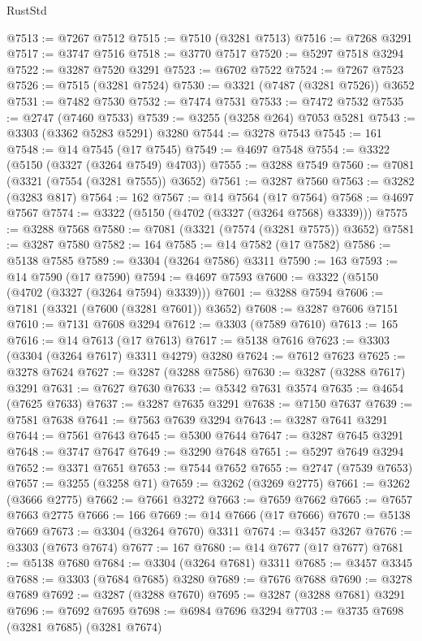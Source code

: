 \begin{lexlean}{RustStd}
\begin{coremodule}
@7513 := @7267 @7512
@7515 := @7510 (@3281 @7513)
@7516 := @7268 @3291
@7517 := @3747 @7516
@7518 := @3770 @7517
@7520 := @5297 @7518 @3294
@7522 := @3287 @7520 @3291
@7523 := @6702 @7522
@7524 := @7267 @7523
@7526 := @7515 (@3281 @7524)
@7530 := @3321 (@7487 (@3281 @7526)) @3652
@7531 := @7482 @7530
@7532 := @7474 @7531
@7533 := @7472 @7532
@7535 := @2747 (@7460 @7533)
@7539 := @3255 (@3258 @264) @7053 @5281
@7543 := @3303 (@3362 @5283 @5291) @3280
@7544 := @3278 @7543
@7545 := 161
@7548 := @14 @7545 (@17 @7545)
@7549 := @4697 @7548
@7554 := @3322 (@5150 (@3327 (@3264 @7549) @4703))
@7555 := @3288 @7549
@7560 := @7081 (@3321 (@7554 (@3281 @7555)) @3652)
@7561 := @3287 @7560
@7563 := @3282 (@3283 @817)
@7564 := 162
@7567 := @14 @7564 (@17 @7564)
@7568 := @4697 @7567
@7574 := @3322 (@5150 (@4702 (@3327 (@3264 @7568) @3339)))
@7575 := @3288 @7568
@7580 := @7081 (@3321 (@7574 (@3281 @7575)) @3652)
@7581 := @3287 @7580
@7582 := 164
@7585 := @14 @7582 (@17 @7582)
@7586 := @5138 @7585
@7589 := @3304 (@3264 @7586) @3311
@7590 := 163
@7593 := @14 @7590 (@17 @7590)
@7594 := @4697 @7593
@7600 := @3322 (@5150 (@4702 (@3327 (@3264 @7594) @3339)))
@7601 := @3288 @7594
@7606 := @7181 (@3321 (@7600 (@3281 @7601)) @3652)
@7608 := @3287 @7606 @7151
@7610 := @7131 @7608 @3294
@7612 := @3303 (@7589 @7610)
@7613 := 165
@7616 := @14 @7613 (@17 @7613)
@7617 := @5138 @7616
@7623 := @3303 (@3304 (@3264 @7617) @3311 @4279) @3280
@7624 := @7612 @7623
@7625 := @3278 @7624
@7627 := @3287 (@3288 @7586)
@7630 := @3287 (@3288 @7617) @3291
@7631 := @7627 @7630
@7633 := @5342 @7631 @3574
@7635 := @4654 (@7625 @7633)
@7637 := @3287 @7635 @3291
@7638 := @7150 @7637
@7639 := @7581 @7638
@7641 := @7563 @7639 @3294
@7643 := @3287 @7641 @3291
@7644 := @7561 @7643
@7645 := @5300 @7644
@7647 := @3287 @7645 @3291
@7648 := @3747 @7647
@7649 := @3290 @7648
@7651 := @5297 @7649 @3294
@7652 := @3371 @7651
@7653 := @7544 @7652
@7655 := @2747 (@7539 @7653)
@7657 := @3255 (@3258 @71)
@7659 := @3262 (@3269 @2775)
@7661 := @3262 (@3666 @2775)
@7662 := @7661 @3272
@7663 := @7659 @7662
@7665 := @7657 @7663 @2775
@7666 := 166
@7669 := @14 @7666 (@17 @7666)
@7670 := @5138 @7669
@7673 := @3304 (@3264 @7670) @3311
@7674 := @3457 @3267
@7676 := @3303 (@7673 @7674)
@7677 := 167
@7680 := @14 @7677 (@17 @7677)
@7681 := @5138 @7680
@7684 := @3304 (@3264 @7681) @3311
@7685 := @3457 @3345
@7688 := @3303 (@7684 @7685) @3280
@7689 := @7676 @7688
@7690 := @3278 @7689
@7692 := @3287 (@3288 @7670)
@7695 := @3287 (@3288 @7681) @3291
@7696 := @7692 @7695
@7698 := @6984 @7696 @3294
@7703 := @3735 @7698 (@3281 @7685) (@3281 @7674)

\end{coremodule}
\end{lexlean}

